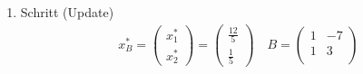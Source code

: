\documentclass[a4paper]{scrartcl}
\begin{document}
\begin{enumerate}[label=\bfseries\arabic*.]
\begin{enumerate}[1.]
\begin{enumerate}[1.]
                    \item Schritt (Update)
                        \begin{gather}
                            x_B^* =
                            \begin{pmatrix}
                                x_1^* \\ x_2^*
                            \end{pmatrix}
                            =
                            \begin{pmatrix}
                                \frac{12}{5} \\ \frac{1}{5}
                            \end{pmatrix}
                            \quad
                            B =
                            \begin{pmatrix}
                                1 & -7 \\
                                1 &  3 \\
                            \end{pmatrix}
                        \end{gather}

                \end{enumerate}

        \end{enumerate}


\end{enumerate}
\end{document}
